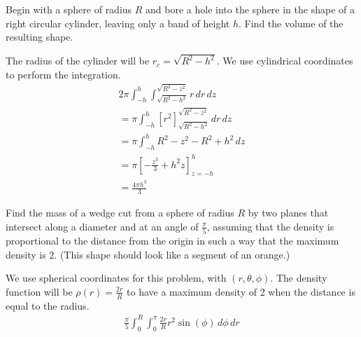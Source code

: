 \documentclass[12pt]{exam}
\begin{document}
\begin{questions}
	\clearpage
\question Begin with a sphere of radius $R$ and bore a hole into the sphere in the shape of a right circular cylinder, leaving only a band of height $h$. Find the volume of the resulting shape.
	\begin{solution}
		The radius of the cylinder will be $r_c = \sqrt{R^2 - h^2}$. We use cylindrical coordinates to perform the integration.
		\begin{gather*}
			2\pi \int_{-h}^{h} \int_{\sqrt{R^2 - h^2}}^{\sqrt{R^2 - z^2}} r \, dr\, dz \\
			= \pi \int_{-h}^{h} \left[r^2\right]_{\sqrt{R^2 - h^2}}^{\sqrt{R^2 - z^2}}  \, dr\, dz  \\
			= \pi \int_{-h}^{h} R^2 - z^2 - R^2 + h^2 \, dz \\
			= \pi \left[-\frac{z^3}{3} + h^2 z \right]_{z = -h}^{h} \\
			= \boxed{\frac{4\pi h^3}{3}} \tag*{\qed}
		\end{gather*}
	\end{solution}
	\clearpage
\question Find the mass of a wedge cut from a sphere of radius $R$ by two planes that intersect along a diameter and at an angle of $\frac{\pi}{5}$, assuming that the density is proportional to the distance from the origin in such a way that the maximum density is 2. (This shape should look like a segment of an orange.)
	\begin{solution}
		We use spherical coordinates for this problem, with $(r, \theta, \phi)$. The density function will be $\rho (r) = \frac{2 r}{R}$ to have a maximum density of 2 when the distance is equal to the radius.
		\begin{gather*}
			\frac{\pi}{5}\int_{0}^{R}\int_{0}^{\pi} \frac{2 r}{R} r^2 \sin(\phi)\, d\phi \, dr \\

\end{gather*}
\end{solution}
\end{questions}
\end{document}
